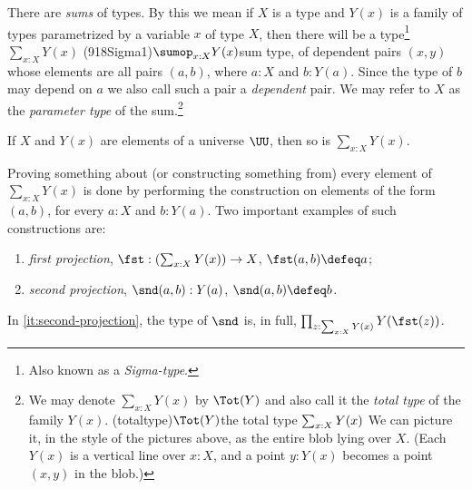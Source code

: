 There are \emph{sums} of types.
By this we mean if $X$ is a type and $Y(x)$ is a family of types parametrized by a variable $x$ of type $X$, then
there will be a type\footnote{%
  Also known as a \emph{Sigma-type}.}
$\sum _{x:X} Y(x)$%
%
\glossary(918Sigma1){$\sumop _{x:X} Y(x)$}{sum type, of dependent pairs $(x,y)$}
whose elements are all pairs $(a,b)$, where $a:X$ and $b:Y(a)$. Since the type of $b$ may depend on $a$ we also call such a pair
a \emph{dependent} pair. We may refer to $X$ as the \emph{parameter
  type} of the sum.\footnote{%
  We may denote $\sum_{x:X}Y(x)$ by $\Tot(Y)$
  and also call it the \emph{total type} of the family $Y(x)$.
  \glossary(totaltype){$\protect\Tot(Y)$}{the total type $\protect\sum_{x:X}Y(x)$}
  We can picture it, in the style of the pictures above,
  as the entire blob lying over $X$. (Each $Y(x)$ is a vertical line over $x:X$,
  and a point $y:Y(x)$ becomes a point $(x,y)$ in the blob.)\par
  }

If $X$ and $Y(x)$ are elements of a universe $\UU$, then so is $\sum _{x:X} Y(x)$.

Proving something about (or constructing something from) every
element of $\sum _{x:X} Y(x)$ is done by performing the construction on elements of the form $(a,b)$, for every $a:X$ and $b: Y(a)$.
Two important examples of such constructions are:
\begin{enumerate}
\item \emph{first projection},
$\fst:(\sum _{x:X} Y(x)) \to X$,
$\fst(a,b)\defeq a$;
\item\label{it:second-projection} \emph{second projection},
$\snd(a,b): Y(a)$,
$\snd(a,b)\defeq b$.
\end{enumerate}
In \ref{it:second-projection}, the type of $\snd$ is, in full,
$\prod_{z:\sum_{x:X} Y(x)} Y(\fst(z))$.

